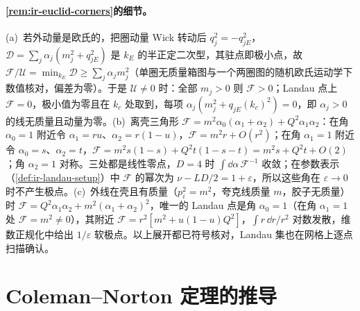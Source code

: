\paragraph{\cref{rem:ir-euclid-corners}的细节。}(a)~若外动量是欧氏的，把圈动量 Wick 转动后 $q_j^2=-q_{jE}^2$，$\mathcal D=\sum_j\alpha_j(m_j^2+q_{jE}^2)$ 是 $k_E$ 的半正定二次型，其驻点即极小点，故 $\mathcal F/\mathcal U=\min_{k_E}\mathcal D\ge\sum_j\alpha_jm_j^2$（单圈无质量箱图与一个两圈图的随机欧氏运动学下数值核对，偏差为零）。于是 $\mathcal U\ne0$ 时：全部 $m_j>0$ 则 $\mathcal F>0$；Landau 点上 $\mathcal F=0$，极小值为零且在 $k_c$ 处取到，每项 $\alpha_j(m_j^2+q_{jE}(k_c)^2)=0$，即 $\alpha_j>0$ 的线无质量且动量为零。(b)~离壳三角形 $\mathcal F=m^2\alpha_0(\alpha_1+\alpha_2)+Q^2\alpha_1\alpha_2$：在角 $\alpha_0=1$ 附近令 $\alpha_1=ru$、$\alpha_2=r(1-u)$，$\mathcal F=m^2r+O(r^2)$；在角 $\alpha_1=1$ 附近令 $\alpha_0=s$、$\alpha_2=t$，$\mathcal F=m^2s(1-s)+Q^2t(1-s-t)=m^2s+Q^2t+O(2)$；角 $\alpha_2=1$ 对称。三处都是线性零点，$D=4$ 时 $\int\dd\alpha\,\mathcal F^{-1}$ 收敛；在参数表示（\cref{def:ir-landau-setup}）中 $\mathcal F$ 的幂次为 $\nu-LD/2=1+\varepsilon$，所以这些角在 $\varepsilon\to0$ 时不产生极点。(c)~外线在壳且有质量（$p_i^2=m^2$，夸克线质量 $m$，胶子无质量）时 $\mathcal F=Q^2\alpha_1\alpha_2+m^2(\alpha_1+\alpha_2)^2$，唯一的 Landau 点是角 $\alpha_0=1$（在角 $\alpha_1=1$ 处 $\mathcal F=m^2\ne0$），其附近 $\mathcal F=r^2[m^2+u(1-u)Q^2]$，$\int r\,\dd r/r^2$ 对数发散，维数正规化中给出 $1/\varepsilon$ 软极点。以上展开都已符号核对，Landau 集也在网格上逐点扫描确认。

\section{Coleman--Norton 定理的推导}\label{sec:appD-cn}

